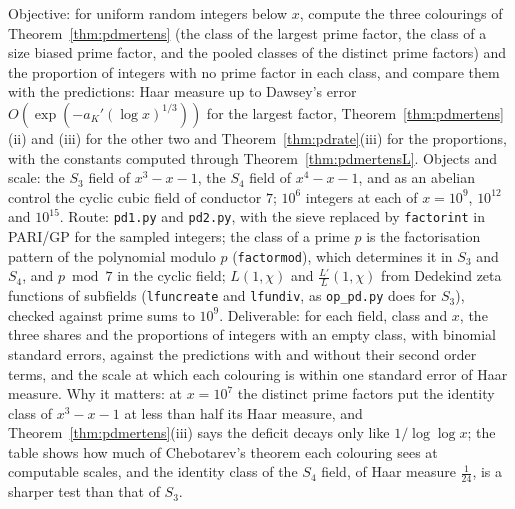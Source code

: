 \begin{compproblem}\label{cp:pdcolour}
Objective: for uniform random integers below $x$, compute the three colourings of Theorem~\ref{thm:pdmertens} (the class of the largest prime factor, the class of a size biased prime factor, and the pooled classes of the distinct prime factors) and the proportion of integers with no prime factor in each class, and compare them with the predictions: Haar measure up to Dawsey's error $O(\exp(-a_K'(\log x)^{1/3}))$ for the largest factor, Theorem~\ref{thm:pdmertens}(ii) and (iii) for the other two and Theorem~\ref{thm:pdrate}(iii) for the proportions, with the constants computed through Theorem~\ref{thm:pdmertensL}. Objects and scale: the $S_3$ field of $x^3-x-1$, the $S_4$ field of $x^4-x-1$, and as an abelian control the cyclic cubic field of conductor $7$; $10^6$ integers at each of $x=10^9$, $10^{12}$ and $10^{15}$. Route: \texttt{pd1.py} and \texttt{pd2.py}, with the sieve replaced by \texttt{factorint} in PARI/GP for the sampled integers; the class of a prime $p$ is the factorisation pattern of the polynomial modulo $p$ (\texttt{factormod}), which determines it in $S_3$ and $S_4$, and $p\bmod7$ in the cyclic field; $L(1,\chi)$ and $\frac{L'}L(1,\chi)$ from Dedekind zeta functions of subfields (\texttt{lfuncreate} and \texttt{lfundiv}, as \texttt{op\_pd.py} does for $S_3$), checked against prime sums to $10^9$. Deliverable: for each field, class and $x$, the three shares and the proportions of integers with an empty class, with binomial standard errors, against the predictions with and without their second order terms, and the scale at which each colouring is within one standard error of Haar measure. Why it matters: at $x=10^7$ the distinct prime factors put the identity class of $x^3-x-1$ at less than half its Haar measure, and Theorem~\ref{thm:pdmertens}(iii) says the deficit decays only like $1/\log\log x$; the table shows how much of Chebotarev's theorem each colouring sees at computable scales, and the identity class of the $S_4$ field, of Haar measure $\frac1{24}$, is a sharper test than that of $S_3$.
\end{compproblem}

